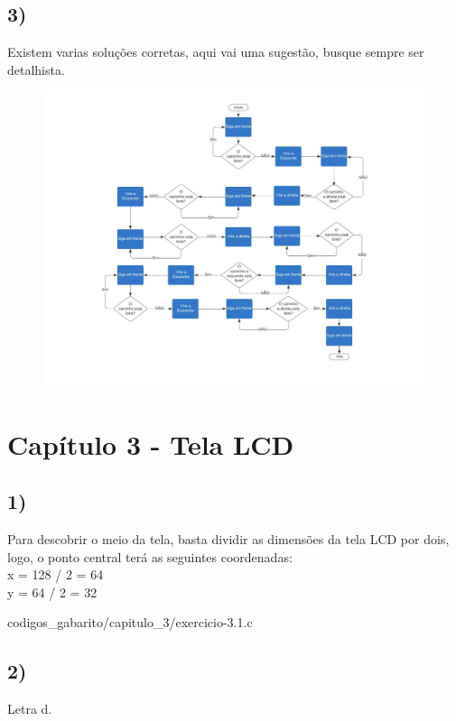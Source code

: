     \subsection*{3)} Existem varias soluções corretas, aqui vai uma sugestão, busque sempre ser detalhista.
        \begin{figure}[H]
        \centering
        \includegraphics[width=18cm]{Figuras/sollab.jpg}
        \label{figura:solução.jpg}
        \end{figure}
    
\section*{Capítulo 3 - Tela LCD}
    
    \subsection*{1)} Para descobrir o meio da tela, basta dividir as dimensões da tela LCD por dois, logo, o ponto central terá as seguintes coordenadas: \\ x = 128 / 2 = 64 \\ y = 64 / 2 = 32
    

     {codigos_gabarito/capitulo_3/exercicio-3.1.c}
    
    \subsection*{2)} Letra d.
    
